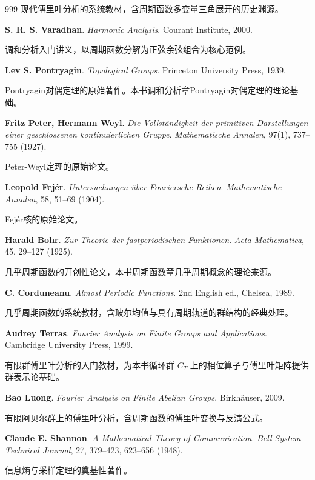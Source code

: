 \begin{thebibliography}{999}
现代傅里叶分析的系统教材，含周期函数多变量三角展开的历史渊源。

 \textbf{S. R. S. Varadhan}. \textit{Harmonic Analysis}. Courant Institute, 2000.

调和分析入门讲义，以周期函数分解为正弦余弦组合为核心范例。

 \textbf{Lev S. Pontryagin}. \textit{Topological Groups}. Princeton University Press, 1939.

Pontryagin对偶定理的原始著作。本书调和分析章Pontryagin对偶定理的理论基础。

 \textbf{Fritz Peter, Hermann Weyl}. \textit{Die Vollst\"andigkeit der primitiven Darstellungen einer geschlossenen kontinuierlichen Gruppe}. \textit{Mathematische Annalen}, 97(1), 737--755 (1927).

Peter-Weyl定理的原始论文。

 \textbf{Leopold Fej\'er}. \textit{Untersuchungen \"uber Fouriersche Reihen}. \textit{Mathematische Annalen}, 58, 51--69 (1904).

Fej\'er核的原始论文。

 \textbf{Harald Bohr}. \textit{Zur Theorie der fastperiodischen Funktionen}. \textit{Acta Mathematica}, 45, 29--127 (1925).

几乎周期函数的开创性论文，本书周期函数章几乎周期概念的理论来源。

 \textbf{C. Corduneanu}. \textit{Almost Periodic Functions}. 2nd English ed., Chelsea, 1989.

几乎周期函数的系统教材，含玻尔均值与具有周期轨道的群结构的经典处理。

 \textbf{Audrey Terras}. \textit{Fourier Analysis on Finite Groups and Applications}. Cambridge University Press, 1999.

有限群傅里叶分析的入门教材，为本书循环群 $C_T$ 上的相位算子与傅里叶矩阵提供群表示论基础。

 \textbf{Bao Luong}. \textit{Fourier Analysis on Finite Abelian Groups}. Birkh\"auser, 2009.

有限阿贝尔群上的傅里叶分析，含周期函数的傅里叶变换与反演公式。

 \textbf{Claude E. Shannon}. \textit{A Mathematical Theory of Communication}. \textit{Bell System Technical Journal}, 27, 379--423, 623--656 (1948).

信息熵与采样定理的奠基性著作。


\end{thebibliography}
